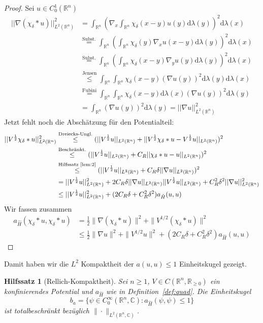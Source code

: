 \documentclass[11pt,a4paper,leqno]{report}
\newtheorem{lemma}[theorem]{Hilfssatz}
\numberwithin{equation}{chapter}
\begin{document}
\begin{proof} Sei $u\in C^1_0(\mathbb{R}^n)$
	\begin{align*}
		||\nabla(\chi_\delta*u)||_{L^2(\mathbb{R}^n)}^2&=\int_{\mathbb{R}^n}(\nabla_x \int_{\mathbb{R}^n}\chi_\delta(x-y)u(y)\mathrm{d}\lambda(y))^2\mathrm{d}\lambda(x)\\
		&\overset{\text{Subst.}}{=}\int_{\mathbb{R}^n}(\int_{\mathbb{R}^n}\chi_\delta(y)\nabla_x u(x-y)\mathrm{d}\lambda(y))^2\mathrm{d}\lambda(x)\\
		&\overset{\text{Subst.}}{=}\int_{\mathbb{R}^n}(\int_{\mathbb{R}^n}\chi_\delta(x-y)\nabla_y u(y)\mathrm{d}\lambda(y))^2\mathrm{d}\lambda(x)\\
		&\overset{\text{Jensen}}{\leq}\int_{\mathbb{R}^n}\int_{\mathbb{R}^n}\chi_\delta(x-y)(\nabla u(y))^2\mathrm{d}\lambda(y)\mathrm{d}\lambda(x)\\
		&\overset{\text{Fubini}}{=}\int_{\mathbb{R}^n}\int_{\mathbb{R}^n}\chi_\delta(x-y)\mathrm{d}\lambda(x)(\nabla u(y))^2\mathrm{d}\lambda(y)\\
		&=\int_{\mathbb{R}^n}(\nabla u(y))^2\mathrm{d}\lambda(y)=||\nabla u||_{L^2(\mathbb{R}^n)}^2
	\end{align*}
Jetzt fehlt noch die Abschätzung für den Potentialteil:
	\begin{align*}
	||V^\frac{1}{2}\chi_\delta*u||_{L^2(\mathbb{R}^n)}^2&\overset{\text{Dreiecks-Ungl.}}{\leq} (||V^\frac{1}{2}u||_{L^2(\mathbb{R}^n)} + ||V^\frac{1}{2}\chi_\delta*u-V^\frac{1}{2}u||_{L^2(\mathbb{R}^n)})^2\\
	&\overset{\text{Beschränkt.}}{\leq} (||V^\frac{1}{2}u||_{L^2(\mathbb{R}^n)} + C_R||\chi_\delta*u-u||_{L^2(\mathbb{R}^n)})^2\\
	&\overset{\text{Hilfssatz~\ref{lem:2}}}{\leq} (||V^\frac{1}{2}u||_{L^2(\mathbb{R}^n)} + C_R\delta||\nabla u||_{L^2(\mathbb{R}^n)})^2\\
	&=||V^\frac{1}{2}u||_{L^2(\mathbb{R}^n)}^2 +2C_R\delta||\nabla u||_{L^2(\mathbb{R}^n)}||V^\frac{1}{2}u||_{L^2(\mathbb{R}^n)}+C_R^2\delta^2||\nabla u||_{L^2(\mathbb{R}^n)}^2\\
	&\leq||V^\frac{1}{2}u||_{L^2(\mathbb{R}^n)}^2 +(2C_R\delta+C_R^2\delta^2)a_{\hat{H}}(u,u)
\end{align*}
Wir fassen zusammen
\begin{align*}
a_{\hat{H}}(\chi_\delta * u, \chi_\delta * u) &= \frac{1}{2}\|\nabla(\chi_\delta * u)\|^2 + \|V^{1/2}(\chi_\delta * u)\|^2 
\\&\leq \frac{1}{2}\|\nabla u\|^2 + \|V^{1/2}u\|^2 + (2C_R\delta + C_R^2\delta^2)a_{\hat{H}}(u,u)
\end{align*}

\end{proof}
\noindent
Damit haben wir die $L^2$ Kompaktheit der $a(u,u)\leq 1$ Einheitskugel gezeigt. 
\begin{lemma}[Rellich-Kompaktheit]\label{lem:rellich}
	Sei $n \geq 1$, $V \in C(\mathbb{R}^n, \mathbb{R}_{\geq 0})$ ein konfinierendes Potential und $a_{\hat{H}}$ wie in Definition~\ref{def:quad}. 
	Die Einheitskugel
	\[
	b_a = \{ \psi \in C^\infty_0(\mathbb{R}^n, \mathbb{C}) : a_{\hat{H}}(\psi, \psi) \leq 1 \}
	\]
	ist totalbeschränkt bezüglich $\|\cdot\|_{L^2(\mathbb{R}^n, \mathbb{C})}$.
\end{lemma}
\end{document}
